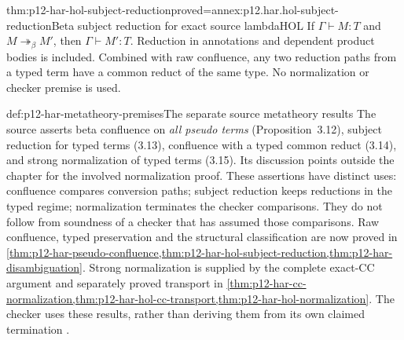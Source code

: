 \begin{hbtheorem}{thm:p12-har-hol-subject-reduction}{proved=annex:p12.har.hol-subject-reduction}{Beta subject reduction for exact source lambdaHOL}
If \(\Gamma\vdash M:T\) and
\(M\twoheadrightarrow_\beta M'\), then
\(\Gamma\vdash M':T\). Reduction in annotations and dependent
product bodies is included. Combined with raw confluence, any two
reduction paths from a typed term have a common reduct of the same type.
No normalization or checker premise is used.
\end{hbtheorem}

\begin{hbdefinition}{def:p12-har-metatheory-premises}{The separate source metatheory results}
The source asserts beta confluence on \emph{all pseudo terms}
(Proposition~3.12), subject reduction for typed terms (3.13), confluence
with a typed common reduct (3.14), and strong normalization of typed terms
(3.15). Its discussion points outside the chapter for the involved
normalization proof. These assertions have distinct uses: confluence
compares conversion paths; subject reduction keeps reductions in the
typed regime; normalization terminates the checker comparisons. They do
not follow from soundness of a checker that has assumed those comparisons.
Raw confluence, typed preservation and the structural classification
are now proved in
\cref{thm:p12-har-pseudo-confluence,thm:p12-har-hol-subject-reduction,thm:p12-har-disambiguation}.
Strong normalization is supplied by the complete exact-CC argument
and separately proved transport in
\cref{thm:p12-har-cc-normalization,thm:p12-har-hol-cc-transport,thm:p12-har-hol-normalization}.
The checker uses these results, rather than deriving them from its own
claimed termination
\cite[pp.~1191--1192, Propositions~3.12--3.15]{BarendregtGeuvers2001}.
\end{hbdefinition}

